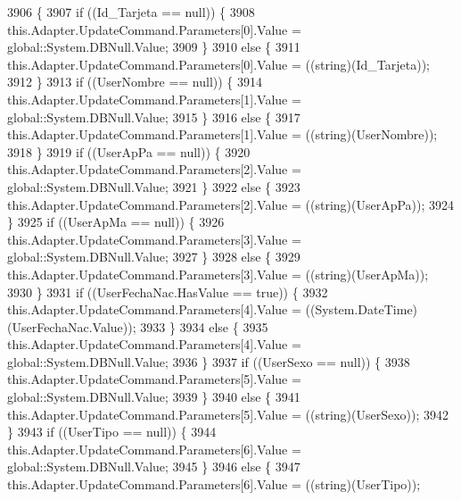 \begin{DoxyCode}
3906                                                                        \{
3907             \textcolor{keywordflow}{if} ((Id\_Tarjeta == null)) \{
3908                 this.Adapter.UpdateCommand.Parameters[0].Value = global::System.DBNull.Value;
3909             \}
3910             \textcolor{keywordflow}{else} \{
3911                 this.Adapter.UpdateCommand.Parameters[0].Value = ((string)(Id\_Tarjeta));
3912             \}
3913             \textcolor{keywordflow}{if} ((UserNombre == null)) \{
3914                 this.Adapter.UpdateCommand.Parameters[1].Value = global::System.DBNull.Value;
3915             \}
3916             \textcolor{keywordflow}{else} \{
3917                 this.Adapter.UpdateCommand.Parameters[1].Value = ((string)(UserNombre));
3918             \}
3919             \textcolor{keywordflow}{if} ((UserApPa == null)) \{
3920                 this.Adapter.UpdateCommand.Parameters[2].Value = global::System.DBNull.Value;
3921             \}
3922             \textcolor{keywordflow}{else} \{
3923                 this.Adapter.UpdateCommand.Parameters[2].Value = ((string)(UserApPa));
3924             \}
3925             \textcolor{keywordflow}{if} ((UserApMa == null)) \{
3926                 this.Adapter.UpdateCommand.Parameters[3].Value = global::System.DBNull.Value;
3927             \}
3928             \textcolor{keywordflow}{else} \{
3929                 this.Adapter.UpdateCommand.Parameters[3].Value = ((string)(UserApMa));
3930             \}
3931             \textcolor{keywordflow}{if} ((UserFechaNac.HasValue == \textcolor{keyword}{true})) \{
3932                 this.Adapter.UpdateCommand.Parameters[4].Value = ((System.DateTime)(UserFechaNac.Value));
3933             \}
3934             \textcolor{keywordflow}{else} \{
3935                 this.Adapter.UpdateCommand.Parameters[4].Value = global::System.DBNull.Value;
3936             \}
3937             \textcolor{keywordflow}{if} ((UserSexo == null)) \{
3938                 this.Adapter.UpdateCommand.Parameters[5].Value = global::System.DBNull.Value;
3939             \}
3940             \textcolor{keywordflow}{else} \{
3941                 this.Adapter.UpdateCommand.Parameters[5].Value = ((string)(UserSexo));
3942             \}
3943             \textcolor{keywordflow}{if} ((UserTipo == null)) \{
3944                 this.Adapter.UpdateCommand.Parameters[6].Value = global::System.DBNull.Value;
3945             \}
3946             \textcolor{keywordflow}{else} \{
3947                 this.Adapter.UpdateCommand.Parameters[6].Value = ((string)(UserTipo));

\end{DoxyCode}
